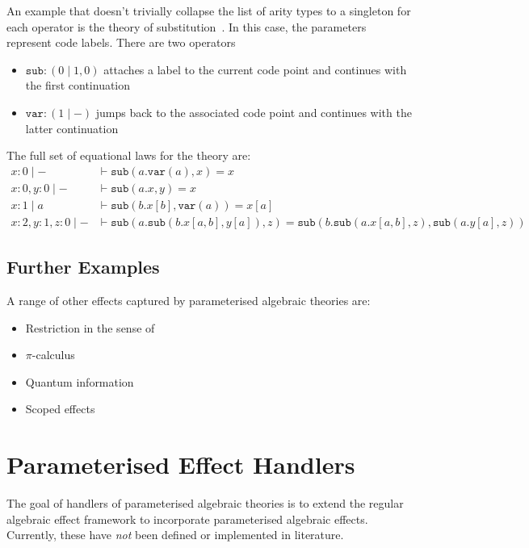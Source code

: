 \documentclass{scrartcl}
\theoremstyle{definition}
\newcommand{\sub}{\mathtt{sub}}
\newcommand{\var}{\mathtt{var}}
\begin{document}
An example that doesn't trivially collapse the list of arity types to a singleton for each operator is the theory of substitution~\cite{fiore_substitution_2014}. In this case, the parameters represent code labels. There are two operators
\begin{itemize}
    \item $\sub : (0\mid 1, 0)$ attaches a label to the current code point and continues with the first continuation
    \item $\var : (1 \mid -)$ jumps back to the associated code point and continues with the latter continuation
\end{itemize}
The full set of equational laws for the theory are:
\begin{align*}
    x: 0 \mid - &\vdash \sub(a.\var(a), x) = x \\
    x: 0, y:0 \mid - &\vdash \sub(a.x,y) = x \\
    x: 1 \mid a &\vdash \sub(b.x[b], \var(a)) = x[a] \\
    x:2, y:1, z:0 \mid - &\vdash
    \sub(a.\sub(b.x[a, b], y[a]), z) = \sub(b.\sub(a.x[a, b], z), \sub(a.y[a], z))
\end{align*}

\subsection{Further Examples}

A range of other effects captured by parameterised algebraic theories are:
\begin{itemize}
    \item Restriction \cite{staton_instances_2013} in the sense of \cite{pitts_structural_2011}
    \item $\pi$-calculus \cite{staton_instances_2013}
    \item Quantum information \cite{staton_algebraic_2015}
    \item Scoped effects~\cite{lindley_scoped_2024}
\end{itemize}

\section{Parameterised Effect Handlers}

The goal of handlers of parameterised algebraic theories is to extend the regular algebraic effect framework to incorporate parameterised algebraic effects.
Currently, these have \emph{not} been defined or implemented in literature.
\end{document}

